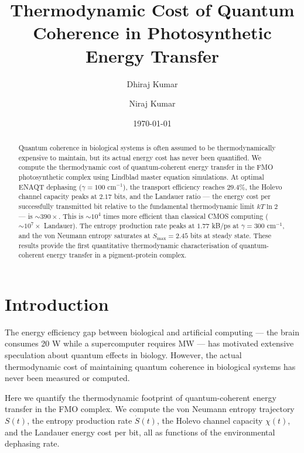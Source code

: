 \documentclass[aps,prl,twocolumn,showpacs,superscriptaddress]{revtex4-2}
\begin{document}
\title{Thermodynamic Cost of Quantum Coherence in Photosynthetic Energy Transfer}

\author{Dhiraj Kumar}
\author{Niraj Kumar}
\affiliation{}

\date{\today}

\begin{abstract}
Quantum coherence in biological systems is often assumed to be thermodynamically expensive to maintain, but its actual energy cost has never been quantified. We compute the thermodynamic cost of quantum-coherent energy transfer in the FMO photosynthetic complex using Lindblad master equation simulations. At optimal ENAQT dephasing ($\gamma = 100$ cm$^{-1}$), the transport efficiency reaches $29.4\%$, the Holevo channel capacity peaks at $2.17$ bits, and the Landauer ratio --- the energy cost per successfully transmitted bit relative to the fundamental thermodynamic limit $kT\ln2$ --- is $\sim 390\times$. This is $\sim 10^4$ times more efficient than classical CMOS computing ($\sim 10^7\times$ Landauer). The entropy production rate peaks at $1.77$ kB/ps at $\gamma = 300$ cm$^{-1}$, and the von Neumann entropy saturates at $S_{\max} = 2.45$ bits at steady state. These results provide the first quantitative thermodynamic characterisation of quantum-coherent energy transfer in a pigment-protein complex.
\end{abstract}

\maketitle

\section{Introduction}

The energy efficiency gap between biological and artificial computing --- the brain consumes 20 W while a supercomputer requires MW --- has motivated extensive speculation about quantum effects in biology. However, the actual thermodynamic cost of maintaining quantum coherence in biological systems has never been measured or computed.

Here we quantify the thermodynamic footprint of quantum-coherent energy transfer in the FMO complex. We compute the von Neumann entropy trajectory $S(t)$, the entropy production rate $\dot{S}(t)$, the Holevo channel capacity $\chi(t)$, and the Landauer energy cost per bit, all as functions of the environmental dephasing rate.
\end{document}
